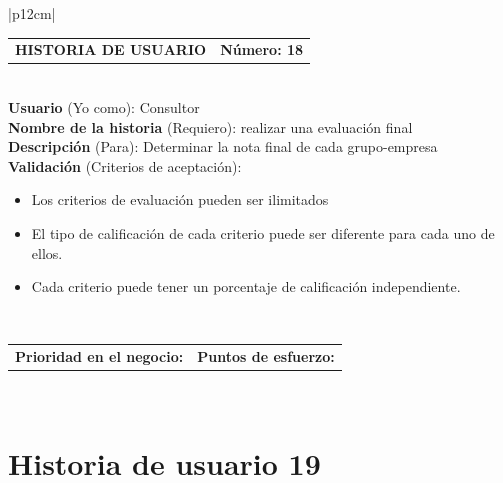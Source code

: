 \documentclass[11pt,letterpaper]{report}
\begin{document}
	\begin{center}	
		\begin{tabular}{|p{12cm}|}
			\hline
			\begin{tabular}{c|c}
				\textbf{HISTORIA DE USUARIO} & \textbf{Número: 18} \\
			\end{tabular} \\ \hline
			\textbf{Usuario} (Yo como): Consultor \\ \hline
			\textbf{Nombre de la historia} (Requiero): realizar una evaluación final \\ \hline
			\textbf{Descripción} (Para): Determinar la nota final de cada grupo-empresa \\ \hline
			\textbf{Validación} (Criterios de aceptación): \\
			\begin{minipage}{12cm}
				\begin{itemize}
					\item Los criterios de evaluación pueden ser ilimitados
					\item El tipo de calificación de cada criterio puede ser diferente para cada uno de ellos.
					\item Cada criterio puede tener un porcentaje de calificación independiente.
				\end{itemize}
			\end{minipage} \\ \hline
			\begin{tabular}{c|c}
				\textbf{Prioridad en el negocio: } & \textbf{Puntos de esfuerzo: } \\
			\end{tabular} \\ \hline
		\end{tabular}
	\end{center}
	
	\section{Historia de usuario 19}	
	
\end{document}
